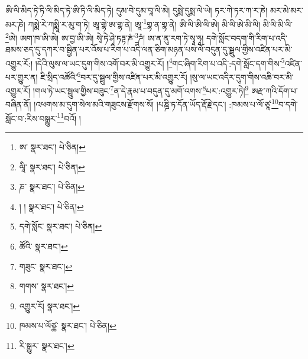 \setcounter{footnote}{0} 
ཨི་ལི་མིད་ཏེ་ཏི་ལི་མིད་ཏེ་ཨི་ཏི་ལི་མིད་ཏེ། དུམ་བེ་དུམ་བཱ་ལི་མེ། དུསྨེ་དུསྨ་ལེ་ཡེ། ཏར་ཀེ་ཏར་ཀ་ར་ཎེ། མར་མེ་མར་མར་ཎེ། ཀསྨེ་རེ་ཀསྨཱི་ར་མུ་ག་ཏེ། ཨཱ་གྷེ་ཨ་གྷ་ནེ། ཨཱ་\footnote{ཨ་  སྣར་ཐང་།  པེ་ཅིན། }གྷ་ན་གྷ་ནེ། ཨི་ལི་ཨི་ལི་ཨེ། མི་ལི་ཨེ་མི་ལི། མི་ལི་མི་ལི་\footnote{ལཱི་  སྣར་ཐང་།  པེ་ཅིན། }ཨེ། ཨག་ཁ་ཨི་ཨེ། ཨ་བྱ་ཨི་ཨེ། སྭེ་ཏེ་ཤྭེ་ཏཏྟ་ཎཾ་\footnote{ཎ་  སྣར་ཐང་།  པེ་ཅིན། }ཌཾ། ཨ་ན་ནུ་རག་ཏེ་སྭཱ་ཧཱ། དགེ་སློང་བདག་གི་རིག་པ་འདི་ཐམས་ཅད་དུ་དཀར་བ་སྦྱིན་པར་འོས་པ་རིག་པ་འདི་ལན་ཅིག་མཉན་པས་ལོ་བདུན་དུ་སྦྲུལ་གྱིས་འཛིན་པར་མི་འགྱུར་རོ:། །དེའི་ལུས་ལ་ཡང་དུག་གིས་འགོ་བར་མི་འགྱུར་རོ། །\footnote{། །  སྣར་ཐང་།  པེ་ཅིན། }གང་ཞིག་རིག་པ་འདི་:དགེ་སློང་དག་གིས་\footnote{དགེ་སློང་  སྣར་ཐང་།  པེ་ཅིན། }འཛིན་པར་གྱུར་ན། ཇི་སྲིད་འཚོའི་\footnote{ཚོའི་  སྣར་ཐང་། }བར་དུ་སྦྲུལ་གྱིས་འཛིན་པར་མི་འགྱུར་རོ། །སུ་ལ་ཡང་འདིར་དུག་གིས་འཆི་བར་མི་འགྱུར་རོ། །གལ་ཏེ་ཡང་སྦྲུལ་གྱིས་བཟུང་\footnote{གཟུང་  སྣར་ཐང་། }ན་དེ་རྣམ་པ་བདུན་དུ་མགོ་འགས་\footnote{གགས་  སྣར་ཐང་། }པར་:འགྱུར་ཏེ།\footnote{འགྱུར་རོ།  སྣར་ཐང་། } ཨརྫ་ཀའི་དོག་པ་བཞིན་ནོ། །འཕགས་མ་དུག་སེལ་མའི་གཟུངས་རྫོགས་སོ། །པཎྜི་ཏ་དོན་ཡོད་རྡོ་རྗེ་དང་། :ཁམས་པ་ལོ་ཙཱ་\footnote{ཁམས་པ་ལོཙྪ་  སྣར་ཐང་།  པེ་ཅིན། }བ་དགེ་སློང་བ་:རིས་བསྒྱུར་\footnote{རི་སྒྱུར་  སྣར་ཐང་། }བའོ། ། 